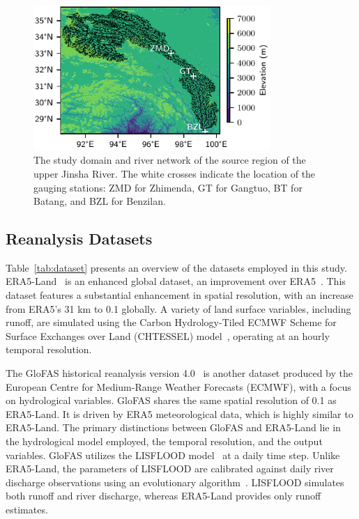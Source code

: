 \documentclass[preprint, review, authoryear, longtitle, 12pt, 3p]{elsarticle}
\begin{document}
\begin{figure}[ht!]
  \centering
  \includegraphics[width=0.8\textwidth]{domain.pdf}
  \caption{The study domain and river network of the source region of the upper Jinsha River. The white crosses indicate the location of the gauging stations: ZMD for Zhimenda, GT for Gangtuo, BT for Batang, and BZL for Benzilan.}
  \label{fig:domain}
\end{figure}

\subsection{Reanalysis Datasets}

Table~\ref{tab:dataset} presents an overview of the datasets employed in this study. ERA5-Land~\citep{munoz-sabater2021ESSD} is an enhanced global dataset, an improvement over ERA5~\citep{hersbach2020QJMRS}. This dataset features a substantial enhancement in spatial resolution, with an increase from ERA5's 31 km to 0.1\textdegree{} globally. A variety of land surface variables, including runoff, are simulated using the Carbon Hydrology-Tiled ECMWF Scheme for Surface Exchanges over Land (CHTESSEL) model~\citep{boussetta2021A, balsamo2009JHM}, operating at an hourly temporal resolution.

The GloFAS historical reanalysis version 4.0~\citep{alfieri2020JH, harrigan2020ESSD} is another dataset produced by the European Centre for Medium-Range Weather Forecasts (ECMWF), with a focus on hydrological variables. GloFAS shares the same spatial resolution of 0.1\textdegree{} as ERA5-Land. It is driven by ERA5 meteorological data, which is highly similar to ERA5-Land. The primary distinctions between GloFAS and ERA5-Land lie in the hydrological model employed, the temporal resolution, and the output variables. GloFAS utilizes the LISFLOOD model~\citep{knijff2010IJGIS} at a daily time step. Unlike ERA5-Land, the parameters of LISFLOOD are calibrated against daily river discharge observations using an evolutionary algorithm~\citep{hirpa2018JH}. LISFLOOD simulates both runoff and river discharge, whereas ERA5-Land provides only runoff estimates.
\end{document}
